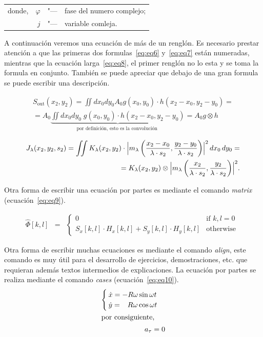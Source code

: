 \documentclass[
10pt,			%
letterpaper,	%
oneside,		%
headinclude, footinclude, %
BCOR5mm, 		%
]{scrartcl}
\begin{document}
\begin{table}[ht]
	\begin{tabular*} {1.0\linewidth}{lrcl}
		donde,	& $\varphi$	& "---	& fase del numero complejo;\\
		& $j$		& "---	& variable comleja.
	\end{tabular*}
\end{table}

A continuación veremos una ecuación de más de un renglón. Es necesario prestar atención a que las primeras dos formulas~\ref{eq:eq6} y~\ref{eq:eq7} están numeradas, mientras que la ecuación larga~\ref{eq:eq8}, el primer renglón no lo esta y se toma la formula en conjunto. También se puede apreciar que debajo de una gran formula se puede escribir una descripción.

\begin{eqnarray} 
S_{\text{out}}(x_2, y_2) = \iint dx_0 dy_0 A_0 g(x_0, y_0) \cdot h(x_2-x_0, y_2 -y_0) =     \label{eq:eq6} \\
= A_0 \underbrace{\iint dx_0 dy_0 \; g(x_0, y_0) 
	\cdot h(x_2-x_0, y_2 -y_0)}_{\text{por definición, esto es la convolución }} = A_0 g     \otimes h 
\label{eq:eq7}
\end{eqnarray}


\begin{eqnarray}
J_\lambda(x_2, y_2, s_2) =
\iint K_\lambda(x_2, y_2) \cdot \Bigl| m_\lambda
\left(
\frac{x_2-x_0}{\lambda \cdot s_2} , \frac{y_2-y_0}{\lambda \cdot s_2}\right)\Bigr|^2 \,dx_0\,dy_0 = \nonumber \\ %
= K_\lambda(x_2, y_2) \otimes \Bigl| m_\lambda \left( \frac{x_2}{\lambda \cdot s_2} , \frac{y_2}{\lambda \cdot s_2} \right) \Bigr|^2.
\label{eq:eq8}
\end{eqnarray}

Otra forma de escribir una ecuación por partes es mediante el comando \emph{matrix} (ecuación~\ref{eq:eq9}).

\begin{equation}
\begin{matrix}
\hat{\Phi}[k,l] & = & \left\{
\begin{matrix}
0 & \mbox{if } k,l = 0 \\
S_x[k,l]\cdot H_x[k,l] + S_y[k,l]\cdot H_y[k,l] & \mbox{otherwise }
\end{matrix} 
\right.
\end{matrix}
\label{eq:eq9}
\end{equation}

Otra forma de escribir muchas ecuaciones es mediante el comando \emph{align}, este comando es muy útil para el desarrollo de ejercicios, demostraciones, etc. que requieran además textos intermedios de explicaciones. La ecuación por partes se realiza mediante el comando \emph{cases} (ecuación~\ref{eq:eq10}).
\begin{align}
\begin{cases}
\dot{x}=-R\omega\sin\omega t\\
\dot{y}=\hphantom{-}R\omega\cos\omega t
\end{cases}
\label{eq:eq10}\\
\intertext{por consiguiente,}
a_{\tau}=0
\label{eq:eq11}
\end{align}
\end{document}
